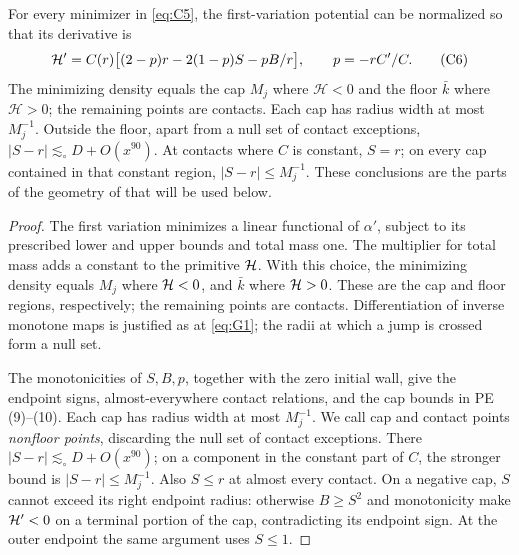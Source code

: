 \begin{lemma}\label{bud:geometry}
For every minimizer in \eqref{eq:C5}, the first-variation potential can be normalized so that its derivative is
\[
 {\cal H}'=C(r)\big[(2-p)r-2(1-p)S-p B/r\big],\qquad p=-r C'/C .
                                                                    \tag{C6}\label{eq:C6}
\]
The minimizing density equals the cap $M_j$ where $\mathcal H<0$
and the floor $\bar k$ where $\mathcal H>0$; the remaining points are
contacts. Each cap has radius width at most $M_j^{-1}$. Outside the
floor, apart from a null set of contact exceptions,
$|S-r|\lesssim_\circ D+O(x^{90})$. At contacts where $C$ is constant, $S=r$; on every cap contained
in that constant region, $|S-r|\le M_j^{-1}$.
These conclusions are the parts of the geometry of
\cite[Lemma~3.3, equations~(9)--(10)]{PE} that will be used below.

\end{lemma}\begin{proof}

The first variation minimizes a linear functional of \(\alpha'\),
subject to its prescribed lower and upper bounds and total mass one.
The multiplier for total mass adds a constant to the primitive
\({\cal H}\). With this choice, the minimizing density equals
\(M_j\) where \({\cal H}<0\), and \(\bar k\) where
\({\cal H}>0\). These are the cap and floor regions, respectively;
the remaining points are contacts. Differentiation of inverse monotone
maps is justified as at \eqref{eq:G1}; the radii at which a jump is
crossed form a null set.

The monotonicities of \(S,B,p\), together with the zero initial wall,
give the endpoint signs, almost-everywhere contact relations, and the
cap bounds in PE (9)--(10). Each cap has radius width at most
\(M_j^{-1}\). We call cap and contact points \emph{nonfloor points},
discarding the null set of contact exceptions. There
\(|S-r|\lesssim_\circ D+O(x^{90})\); on a component in the constant
part of \(C\), the stronger bound is \(|S-r|\le M_j^{-1}\).
Also \(S\le r\) at almost every contact. On a negative cap, \(S\)
cannot exceed its right endpoint radius: otherwise \(B\ge S^2\)
and monotonicity make \({\cal H}'<0\) on a terminal portion of the
cap, contradicting its endpoint sign. At the outer endpoint the same
argument uses \(S\le1\).

\end{proof}


